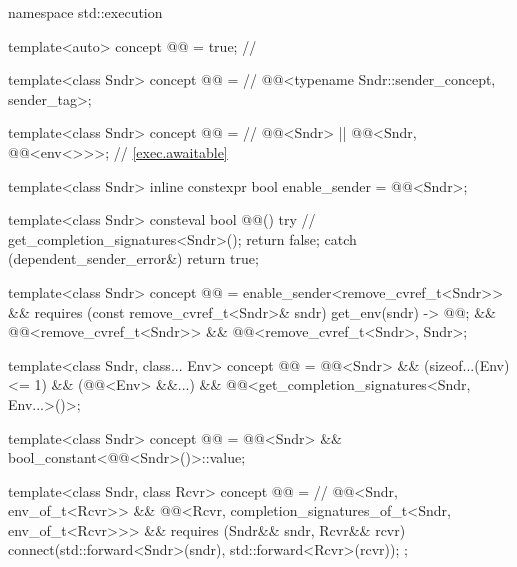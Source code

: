%
\begin{codeblock}
namespace std::execution {
  template<auto>
    concept @@ = true;                                 // \expos

  template<class Sndr>
    concept @@ =                                         // \expos
      @@<typename Sndr::sender_concept, sender_tag>;

  template<class Sndr>
    concept @@ =                                     // \expos
      @@<Sndr> ||
      @@<Sndr, @@<env<>>>;                 // \ref{exec.awaitable}

  template<class Sndr>
    inline constexpr bool enable_sender = @@<Sndr>;

  template<class Sndr>
    consteval bool @@() try {           // \expos
      get_completion_signatures<Sndr>();
      return false;
    } catch (dependent_sender_error&) {
      return true;
    }

  template<class Sndr>
    concept @@ =
      enable_sender<remove_cvref_t<Sndr>> &&
      requires (const remove_cvref_t<Sndr>& sndr) {
        { get_env(sndr) } -> @@;
      } &&
      @@<remove_cvref_t<Sndr>> &&
      @@<remove_cvref_t<Sndr>, Sndr>;

  template<class Sndr, class... Env>
    concept @@ =
      @@<Sndr> &&
      (sizeof...(Env) <= 1) &&
      (@@<Env> &&...) &&
      @@<get_completion_signatures<Sndr, Env...>()>;

  template<class Sndr>
    concept @@ =
      @@<Sndr> && bool_constant<@@<Sndr>()>::value;

  template<class Sndr, class Rcvr>
    concept @@ =                                         // \expos
      @@<Sndr, env_of_t<Rcvr>> &&
      @@<Rcvr, completion_signatures_of_t<Sndr, env_of_t<Rcvr>>> &&
      requires (Sndr&& sndr, Rcvr&& rcvr) {
        connect(std::forward<Sndr>(sndr), std::forward<Rcvr>(rcvr));
      };
}
\end{codeblock}

